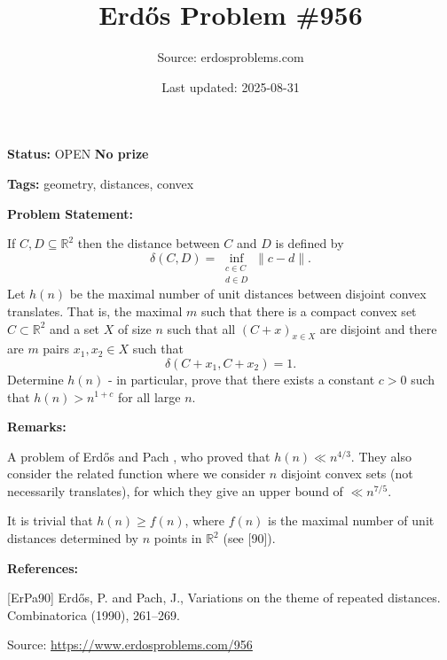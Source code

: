 \documentclass{article}
\title{Erd\H{o}s Problem \#956}
\date{Last updated: 2025-08-31}
\author{Source: erdosproblems.com}
\begin{document}
\maketitle

\noindent\textbf{Status:} OPEN \quad \textbf{No prize}

\noindent\textbf{Tags:} geometry, distances, convex

\medskip
\noindent\textbf{Problem Statement:}

If $C,D\subseteq \mathbb{R}^2$ then the distance between $C$ and $D$ is defined by\[\delta(C,D)=\inf_{\substack{c\in C\\ d\in D}}\| c-d\|.\]Let $h(n)$ be the maximal number of unit distances between disjoint convex translates. That is, the maximal $m$ such that there is a compact convex set $C\subset \mathbb{R}^2$ and a set $X$ of size $n$ such that all $(C+x)_{x\in X}$ are disjoint and there are $m$ pairs $x_1,x_2\in X$ such that\[\delta(C+x_1,C+x_2)=1.\]Determine $h(n)$ - in particular, prove that there exists a constant $c>0$ such that $h(n)>n^{1+c}$ for all large $n$.

\bigskip
\noindent\textbf{Remarks:}

A problem of Erd\H{o}s and Pach \cite{ErPa90}, who proved that $h(n) \ll n^{4/3}$. They also consider the related function where we consider $n$ disjoint convex sets (not necessarily translates), for which they give an upper bound of $\ll n^{7/5}$. 

It is trivial that $h(n)\geq f(n)$, where $f(n)$ is the maximal number of unit distances determined by $n$ points in $\mathbb{R}^2$ (see [90]).

\bigskip
\noindent\textbf{References:}

[ErPa90] Erd\H{o}s, P. and Pach, J., Variations on the theme of repeated distances. Combinatorica (1990), 261--269.

\bigskip
\noindent\small{Source: \url{https://www.erdosproblems.com/956}}
\end{document}
